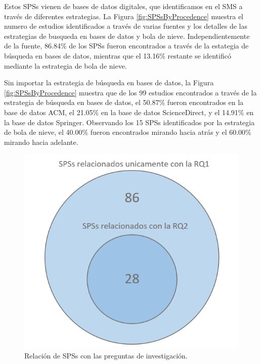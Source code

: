 Estos SPSs vienen de bases de datos digitales, que identificamos en el SMS a través de diferentes estrategias. La Figura \ref{fig:SPSsByProcedence} muestra el numero de estudios identificados a través de varias fuentes y los detalles de las estrategias de busqueda en bases de datos y bola de nieve. Independientemente de la fuente, 86.84\% de los SPSs fueron encontrados a través de la estategia de búsqueda en bases de datos, mientras que el 13.16\% restante se identificó mediante la estrategia de bola de nieve.

Sin importar la estrategia de búsqueda en bases de datos, la Figura \ref{fig:SPSsByProcedence} muestra que de los 99 estudios encontrados a través de la estrategia de búsqueda en bases de datos, el 50.87\% fueron encontrados en la base de datos ACM, el 21.05\% en la base de datos ScienceDirect, y el 14.91\% en la base de datos Springer. Observando los 15 SPSs identificados por la estrategia de bola de nieve, el 40.00\% fueron encontrados mirando hacia atrás y el 60.00\% mirando hacia adelante.

\begin{figure}[htbp]
	\centering
	\vspace{10pt}
	\includegraphics[scale=0.7]{resources/figures/Venn.png}
	\vspace{6pt}
	\caption{Relación de SPSs con las preguntas de investigación.}
	\label{fig:SPSsByRQs}
\end{figure}

